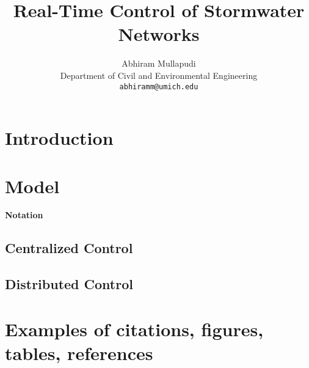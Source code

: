 \documentclass{article}
\title{Real-Time Control of Stormwater Networks}
\author{
  Abhiram Mullapudi \\
  Department of Civil and Environmental Engineering\\
  \texttt{abhiramm@umich.edu} \\
  }
\begin{document}
\maketitle





\section{Introduction}


\section{Model}

\textbf{Notation}

\subsection{Centralized Control}


\subsection{Distributed Control}

\section{Examples of citations, figures, tables, references}


  
\end{document}
